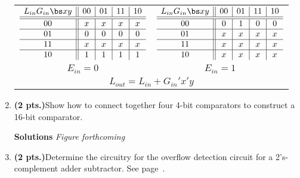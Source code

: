 \begin{enumerate}
\begin{onlysolution}
{                    \begin{tabular}{cc}
                        $
                        \begin{array} {c||c|c|c|c}
                            L_{in} G_{in}  \bs x  y & 00 & 01 & 11 & 10 \\ \hline \hline
                            00       & x  & x  & x  & x  \\ \hline
                            01       & 0  & 0  & 0  & 0  \\ \hline
                            11       & x  & x  & x  & x  \\ \hline
                            10       & 1  & 1  & 1  & 1  \\
                        \end{array}$
                        &
                        $
                        \begin{array} {c||c|c|c|c}
                            L_{in} G_{in}  \bs x  y & 00 & 01 & 11 & 10 \\ \hline \hline
                            00       & 0  & 1  & 0  & 0  \\ \hline
                            01       & x  & x  & x  & x  \\ \hline
                            11       & x  & x  & x  & x  \\ \hline
                            10       & x  & x  & x  & x  \\
                        \end{array}$  \\
                        $E_{in}=0$ & $E_{in}=1$ \\
                        \multicolumn{2}{c}{$L_{out} = L_{in} + G_{in}'x'y$} \\
                    \end{tabular}
                }
            \end{onlysolution}

        \item \textbf{ (2 pts.)}Show how to connect together four 4-bit comparators to
            construct a 16-bit comparator.

            \begin{onlysolution} \textbf{Solutions} \itshape{ Figure forthcoming}
            \end{onlysolution}

        \item \textbf{ (2 pts.)}Determine the circuitry for the overflow detection
            circuit for a 2's-complement adder subtractor.  See page~\pageref{page:Ovf}.


\end{enumerate}
